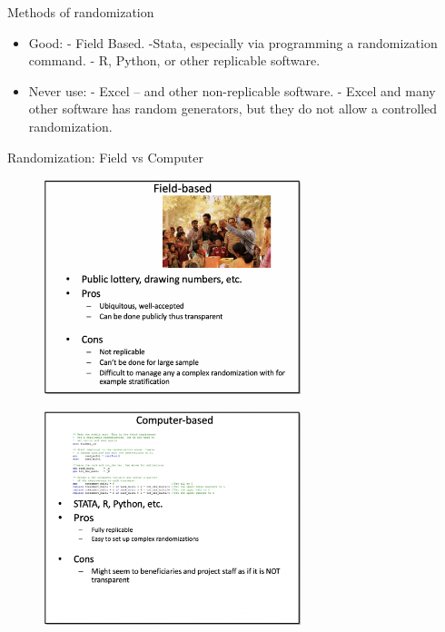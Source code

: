 \documentclass[aspectratio=169]{beamer}
\begin{document}
\begin{frame}{Methods of randomization}

\begin{itemize}[<default overlay specification>]
	\item<1> Good:
		\newline - Field Based.
		\newline -Stata, especially via programming a randomization command. 
		\newline - R, Python, or other replicable software.
	\item<1> Never use:
		\newline - Excel – and other non-replicable software.
		\newline - Excel and many other software has random generators, but they do not allow a controlled randomization. 
\end{itemize}

\end{frame}


\begin{frame}{Randomization: Field vs Computer}
\begin{multicols}{2}	

\begin{figure}
	\centering
	\includegraphics[width=75mm]{img/Randomization}
\end{figure}

\begin{figure}
	\centering
	\includegraphics[width=75mm]{img/Randomization2}
\end{figure}

\end{multicols}
\end{frame}
\end{document}
